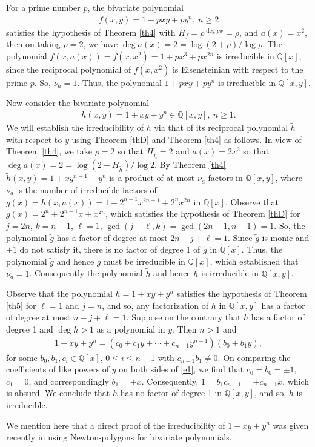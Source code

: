 \documentclass[12pt,reqno]{amsart}%
\begin{document}
\begin{example}
For a prime number $p$, the bivariate polynomial
\begin{eqnarray*}
f(x,y)=1+pxy+py^n,~n\geq 2
\end{eqnarray*}
satisfies the hypothesis of Theorem \ref{th4} with $H_f=\rho^{\deg px}=\rho$, and $a(x)=x^2$, then on taking $\rho=2$, we have $\deg a(x)=2=\log (2+\rho)/\log \rho$. The polynomial $f(x,a(x))=f(x,x^2)=1+px^3+px^{2n}$ is irreducible in $\mathbb{Q}[x]$, since the reciprocal polynomial of $f(x,x^2)$ is Eisensteinian with respect to the prime $p$. So, $\nu_a=1$. Thus, the polynomial $1+pxy+py^n$ is irreducible in $\mathbb{Q}[x,y]$.
\end{example}
\begin{example}
Now consider the bivariate polynomial
\begin{eqnarray*}
h(x,y)=1+xy+y^n\in\mathbb{Q}[x,y],~n\geq 1.
\end{eqnarray*}
We will establish the irreducibility of $h$ via that of its reciprocal polynomial $\tilde{h}$ with respect to $y$ using Theorem \ref{thD} and Theorem  \ref{th4} as follows. In view of Theorem \ref{th4}, we take $\rho=2$ so that $H_{\tilde{h}}=2$ and $a(x)=2x^2$ so that $\deg a(x)=2=\log(2+H_{\tilde{h}})/\log 2$. By Theorem \ref{th4} $\tilde{h}(x,y)=1+xy^{n-1}+y^n$ is a product of at most $\nu_a$ factors in $\mathbb{Q}[x,y]$, where $\nu_a$ is the number of irreducible factors of $g(x)=\tilde{h}(x,a(x))=1+2^{n-1}x^{2n-1}+2^nx^{2n}$ in $\mathbb{Q}[x]$. Observe that $\tilde{g}(x)=2^n+2^{n-1}x+x^{2n}$, which satisfies the hypothesis of Theorem \ref{thD} for $j=2n$, $k=n-1$, $\ell=1$, $\gcd(j-\ell,k)=\gcd(2n-1,n-1)=1$. So, the polynomial $\tilde{g}$ has a factor of degree at most $2n-j+\ell=1$. Since $\tilde{g}$ is monic and $\pm 1$ do not satisfy it, there is no factor of degree 1 of $\tilde{g}$ in $\mathbb{Q}[x]$. Thus, the polynomial $\tilde{g}$ and hence $g$ must be irreducible in $\mathbb{Q}[x]$, which  established that $\nu_a=1$. Consequently the polynomial $\tilde{h}$ and hence $h$ is irreducible in $\mathbb{Q}[x,y]$.

Observe that the polynomial $h=1+xy+y^n$ satisfies the hypothesis of Theorem \ref{th5} for $\ell=1$ and $j=n$, and so, any factorization of $h$ in $\mathbb{Q}[x,y]$ has a factor of degree at most $n-j+\ell=1$. Suppose on the contrary that $h$ has a factor of degree 1 and $\deg h>1$ as a polynomial in $y$. Then $n>1$ and
\begin{eqnarray}\label{e1}
1+xy+y^n=(c_0+c_1y+\cdots+c_{n-1}y^{n-1})(b_0+b_1y),
\end{eqnarray}
for some $b_0,b_1,c_i\in \mathbb{Q}[x]$, $0\leq i\leq n-1$ with $c_{n-1}b_1\neq 0$. On comparing the coefficients of like powers of $y$ on both sides of \eqref{e1}, we find that $c_0=b_0=\pm 1$, $c_1=0$, and correspondingly $b_1=\pm x$. Consequently,   $1=b_1 c_{n-1}=\pm c_{n-1}x$, which is absurd. We conclude that $h$ has no factor of degree 1 in $\mathbb{Q}[x,y]$, and so, $h$ is irreducible.

We mention here that a direct proof of the irreducibility of $1+xy+y^n$ was given recently in  \cite[Example 5]{NBJRG2024} using Newton-polygons for bivariate polynomials.
\end{example}
\end{document}
